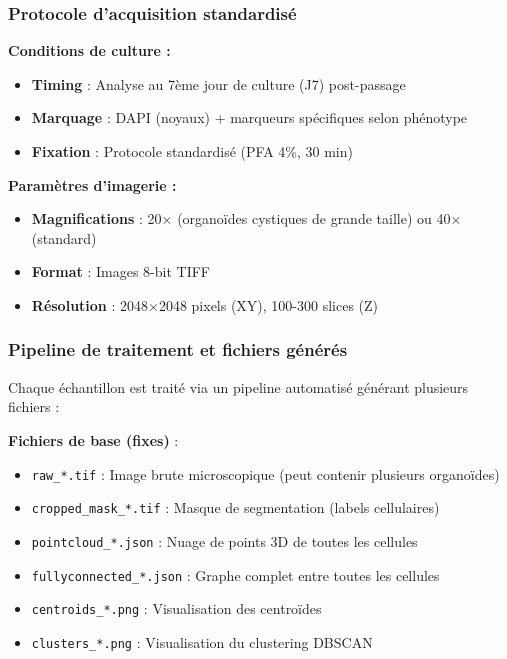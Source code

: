 \subsubsection{Protocole d'acquisition standardisé}

\textbf{Conditions de culture :}
\begin{itemize}
    \item \textbf{Timing} : Analyse au 7ème jour de culture (J7) post-passage
    \item \textbf{Marquage} : DAPI (noyaux) + marqueurs spécifiques selon phénotype
    \item \textbf{Fixation} : Protocole standardisé (PFA 4\%, 30 min)
\end{itemize}

\textbf{Paramètres d'imagerie :}
\begin{itemize}
    \item \textbf{Magnifications} : 20× (organoïdes cystiques de grande taille) ou 40× (standard)
    \item \textbf{Format} : Images 8-bit TIFF
    \item \textbf{Résolution} : 2048×2048 pixels (XY), 100-300 slices (Z)
\end{itemize}

\subsubsection{Pipeline de traitement et fichiers générés}

Chaque échantillon est traité via un pipeline automatisé générant plusieurs fichiers :

\textbf{Fichiers de base (fixes)} :
\begin{itemize}
    \item \texttt{raw\_*.tif} : Image brute microscopique (peut contenir plusieurs organoïdes)
    \item \texttt{cropped\_mask\_*.tif} : Masque de segmentation (labels cellulaires)
    \item \texttt{pointcloud\_*.json} : Nuage de points 3D de toutes les cellules
    \item \texttt{fullyconnected\_*.json} : Graphe complet entre toutes les cellules
    \item \texttt{centroids\_*.png} : Visualisation des centroïdes
    \item \texttt{clusters\_*.png} : Visualisation du clustering DBSCAN
\end{itemize}

